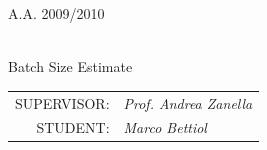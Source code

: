 \begin{titlepage}
		\vskip1.2cm\begin{center}
      \rm\large\uppercase\expandafter{A.A. 2009/2010\\}
 \end{center}
    	
    \vskip 2.5cm\begin{center}
    \HRule \\[0.4cm]\LARGE\expandafter{\sffamily Batch Size Estimate}
    \HRule \\[0.4cm]
    \end{center}
    
    \begin{flushright}\vskip4.0cm 
    \begin{tabular}{rl}
            \rm\large \uppercase{Supervisor:} &\emph{Prof. Andrea Zanella}\\
	   \rm\large \uppercase{Student:} &\emph{Marco Bettiol} \\
		\end{tabular}
     \end{flushright}
    \vfill
    
\end{titlepage}


\newpage

